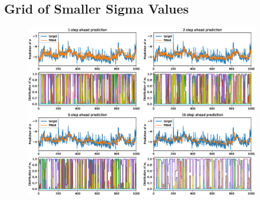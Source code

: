 \subsection{Grid of Smaller Sigma Values}
\label{CH:Appendix:GridSmallerSigma}



\begin{figure}[H]
    \begin{center}
        \includegraphics[width=0.45\textwidth]{Plots/Prediction/Plasticity_Constant_Middle_rolling_1step.eps}
        \includegraphics[width=0.45\textwidth]{Plots/Prediction/Plasticity_Constant_Middle_rolling_2step.eps} \\
        \includegraphics[width=0.45\textwidth]{Plots/Prediction/Plasticity_Constant_Middle_rolling_5step.eps}
        \includegraphics[width=0.45\textwidth]{Plots/Prediction/Plasticity_Constant_Middle_rolling_10step.eps} \\

\end{center}
\end{figure}
